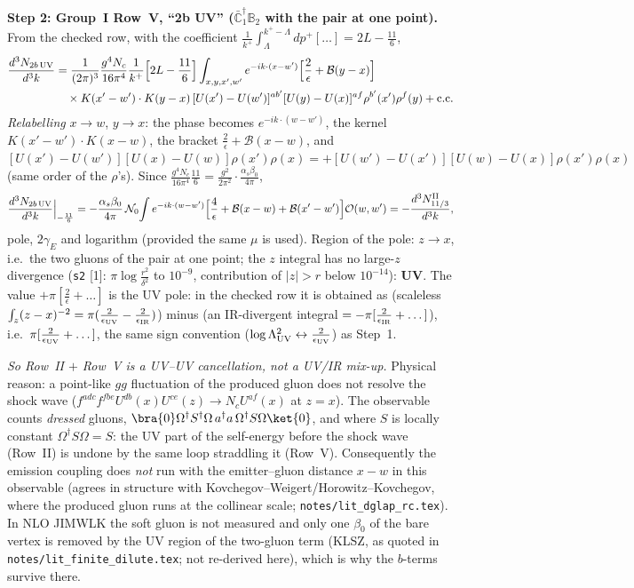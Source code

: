 \documentclass[10pt]{article}
\def\mf#1{\mathbb{#1}}
\begin{document}
\medskip
\noindent\textbf{Step 2: Group~I Row~V, ``2b UV'' ($\bar{\mf{C}}_{1}^{\dagger}\mf{B}_{2}$ with the pair at one point).} From the checked row, with the coefficient $\frac{1}{k^{+}}\int_{\Lambda}^{k^{+}-\Lambda}dp^{+}[\dots]=2L-\frac{11}{6}$,
\begin{align}
\frac{d^{3}N_{2b\,\rm UV}}{d^{3}k}&=\frac{1}{(2\pi)^{3}}\frac{g^{4}N_{c}}{16\pi^{4}}\frac{1}{k^{+}}\Big[2L-\frac{11}{6}\Big]\int_{x,y,x',w'}e^{-ik\cdot(x-w')}\Big[\frac{2}{\epsilon}+\mathcal{B}(y-x)\Big]\notag\\&\quad\times K(x'-w')\cdot K(y-x)\,[U(x')-U(w')]^{ab'}[U(y)-U(x)]^{af}\rho^{b'}(x')\rho^{f}(y)+{\rm c.c.}
\notag
\end{align}
\emph{Relabelling} $x\to w$, $y\to x$: the phase becomes $e^{-ik\cdot(w-w')}$, the kernel $K(x'-w')\cdot K(x-w)$, the bracket $\frac{2}{\epsilon}+\mathcal{B}(x-w)$, and $[U(x')-U(w')][U(x)-U(w)]\rho(x')\rho(x)=+[U(w')-U(x')][U(w)-U(x)]\rho(x')\rho(x)$ (same order of the $\rho$'s). Since $\frac{g^{4}N_{c}}{16\pi^{4}}\frac{11}{6}=\frac{g^{2}}{2\pi^{2}}\cdot\frac{\alpha_{s}\beta_{0}}{4\pi}$,
\begin{align}
\frac{d^{3}N_{2b\,\rm UV}}{d^{3}k}\Big|_{-\frac{11}{6}}=-\frac{\alpha_{s}\beta_{0}}{4\pi}\,\mathcal{N}_{0}\!\int e^{-ik\cdot(w-w')}\Big[\frac{4}{\epsilon}+\mathcal{B}(x-w)+\mathcal{B}(x'-w')\Big]\mathcal{O}(w,w')=-\frac{d^{3}N^{\rm II}_{11/3}}{d^{3}k},
\label{eq:pd-V}
\end{align}
pole, $2\gamma_{E}$ and logarithm (provided the same $\mu$ is used). Region of the pole: $z\to x$, i.e.\ the two gluons of the pair at one point; the $z$ integral has no large-$z$ divergence (\texttt{s2} [1]: $\pi\log\frac{r^{2}}{\delta^{2}}$ to $10^{-9}$, contribution of $|z|>r$ below $10^{-14}$): \textbf{UV}. The value $+\pi[\frac{2}{\epsilon}+\dots]$ is the UV pole: in the checked row it is obtained as (scaleless $\int_{z}(z-x)^{-2}=\pi(\frac{2}{\epsilon_{\rm UV}}-\frac{2}{\epsilon_{\rm IR}})$) minus (an IR-divergent integral $=-\pi[\frac{2}{\epsilon_{\rm IR}}+\dots]$), i.e.\ $\pi[\frac{2}{\epsilon_{\rm UV}}+\dots]$, the same sign convention ($\log\Lambda_{\rm UV}^{2}\leftrightarrow\frac{2}{\epsilon_{\rm UV}}$) as Step~1.

\noindent\emph{So Row~II $+$ Row~V is a UV--UV cancellation, not a UV/IR mix-up.} Physical reason: a point-like $gg$ fluctuation of the produced gluon does not resolve the shock wave ($f^{adc}f^{fbe}U^{db}(x)U^{ce}(z)\to N_{c}U^{af}(x)$ at $z=x$). The observable counts \emph{dressed} gluons, $\bra{0}\Omega^{\dagger}S^{\dagger}\Omega\,a^{\dagger}a\,\Omega^{\dagger}S\Omega\ket{0}$, and where $S$ is locally constant $\Omega^{\dagger}S\Omega=S$: the UV part of the self-energy before the shock wave (Row~II) is undone by the same loop straddling it (Row~V). Consequently the emission coupling does \emph{not} run with the emitter--gluon distance $x-w$ in this observable (agrees in structure with Kovchegov--Weigert/Horowitz--Kovchegov, where the produced gluon runs at the collinear scale; \texttt{notes/lit\_dglap\_rc.tex}). In NLO JIMWLK the soft gluon is not measured and only one $\beta_{0}$ of the bare vertex is removed by the UV region of the two-gluon term (KLSZ, as quoted in \texttt{notes/lit\_finite\_dilute.tex}; not re-derived here), which is why the $b$-terms survive there.
\end{document}
